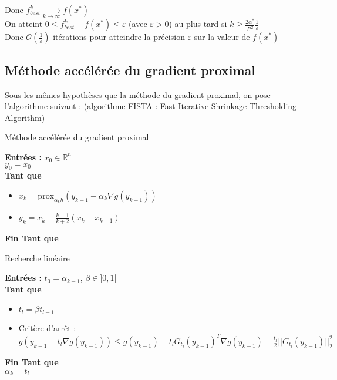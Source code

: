 \documentclass[12pt,a4paper]{article}
\begin{document}
Donc $f_{best}^k \xrightarrow[k \rightarrow \infty]{} f(x^*)$\\


On atteint $0 \leq f_{best}^k - f(x^*) \leq \varepsilon$ (avec $\varepsilon > 0$) au plus tard si $k \geq \frac{2 \alpha^*}{R^2} \frac{1}{\varepsilon}$\\
Donc $\mathcal{O}(\frac{1}{\varepsilon})$ itérations pour atteindre la précision $\varepsilon$ sur la valeur de $f(x^*)$\\


\subsection{Méthode accélérée du gradient proximal}
Sous les mêmes hypothèses que la méthode du gradient proximal, on pose l'algorithme suivant : (algorithme FISTA : Fast Iterative Shrinkage-Thresholding Algorithm)\\

\begin{algorithm}
    \caption{Méthode accélérée du gradient proximal}
    \textbf{Entrées :} $x_0 \in \mathbb{R}^n$\\
    $y_0 = x_0$\\
    \textbf{Tant que}\\
    \begin{itemize}
        \item $x_k = \text{prox}_{\alpha_k h} (y_{k-1} - \alpha_k \nabla g(y_{k-1}))$
        \item $y_k = x_k + \frac{k-1}{k+2} (x_k - x_{k-1})$
    \end{itemize}
    \textbf{Fin Tant que}\\
\end{algorithm}


\begin{algorithm}
    \caption{Recherche linéaire}
    \textbf{Entrées :} $t_0 = \alpha_{k-1}$, $\beta \in ]0, 1[ $\\
    \textbf{Tant que}\\
    \begin{itemize}
        \item $t_l = \beta t_{l-1}$
        \item Critère d'arrêt : $g(y_{k-1} - t_l \nabla g(y_{k-1})) \leq g(y_{k-1}) - t_l G_{t_l}(y_{k-1})^T \nabla g(y_{k-1}) + \frac{t_l}{2} ||G_{t_l}(y_{k-1})||_2^2$\\
    \end{itemize}
    \textbf{Fin Tant que}\\
    $\alpha_k = t_l$\\
\end{algorithm}
\end{document}
